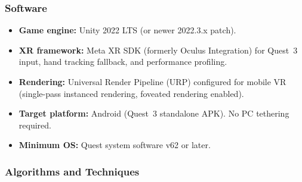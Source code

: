 \documentclass[12pt]{article}
\begin{document}
\subsubsection{Software}

\begin{itemize}[leftmargin=2em]
    \item \textbf{Game engine:} Unity 2022 LTS (or newer 2022.3.x patch).
    \item \textbf{XR framework:} Meta XR SDK (formerly Oculus Integration) for Quest~3 input, hand tracking fallback, and performance profiling.
    \item \textbf{Rendering:} Universal Render Pipeline (URP) configured for mobile VR (single-pass instanced rendering, foveated rendering enabled).
    \item \textbf{Target platform:} Android (Quest~3 standalone APK). No PC tethering required.
    \item \textbf{Minimum OS:} Quest system software v62 or later.
\end{itemize}

\subsubsection{Algorithms and Techniques}
\end{document}
